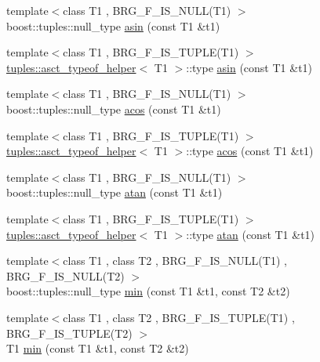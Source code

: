\begin{DoxyCompactItemize}
\item 
{\footnotesize template$<$class T1 , B\+R\+G\+\_\+\+F\+\_\+\+I\+S\+\_\+\+N\+U\+L\+L(\+T1) $>$ }\\boost\+::tuples\+::null\+\_\+type \hyperlink{namespaceIceBRG_a3748adeccfe6224ed0f6d39abcc87196}{asin} (const T1 \&t1)
\item 
{\footnotesize template$<$class T1 , B\+R\+G\+\_\+\+F\+\_\+\+I\+S\+\_\+\+T\+U\+P\+L\+E(\+T1) $>$ }\\\hyperlink{namespaceIceBRG_1_1tuples_structIceBRG_1_1tuples_1_1asct__typeof__helper}{tuples\+::asct\+\_\+typeof\+\_\+helper}$<$ T1 $>$\+::type \hyperlink{namespaceIceBRG_ae628f0785b41278377ed3143774c9346}{asin} (const T1 \&t1)
\item 
{\footnotesize template$<$class T1 , B\+R\+G\+\_\+\+F\+\_\+\+I\+S\+\_\+\+N\+U\+L\+L(\+T1) $>$ }\\boost\+::tuples\+::null\+\_\+type \hyperlink{namespaceIceBRG_a46a20b06ce2c8a11d5fa09bae0f3d6d3}{acos} (const T1 \&t1)
\item 
{\footnotesize template$<$class T1 , B\+R\+G\+\_\+\+F\+\_\+\+I\+S\+\_\+\+T\+U\+P\+L\+E(\+T1) $>$ }\\\hyperlink{namespaceIceBRG_1_1tuples_structIceBRG_1_1tuples_1_1asct__typeof__helper}{tuples\+::asct\+\_\+typeof\+\_\+helper}$<$ T1 $>$\+::type \hyperlink{namespaceIceBRG_a746db7e9f5b6a5dcc357bfb11c6f5458}{acos} (const T1 \&t1)
\item 
{\footnotesize template$<$class T1 , B\+R\+G\+\_\+\+F\+\_\+\+I\+S\+\_\+\+N\+U\+L\+L(\+T1) $>$ }\\boost\+::tuples\+::null\+\_\+type \hyperlink{namespaceIceBRG_a24b307329ff3c6b61fdaee3ba16079b5}{atan} (const T1 \&t1)
\item 
{\footnotesize template$<$class T1 , B\+R\+G\+\_\+\+F\+\_\+\+I\+S\+\_\+\+T\+U\+P\+L\+E(\+T1) $>$ }\\\hyperlink{namespaceIceBRG_1_1tuples_structIceBRG_1_1tuples_1_1asct__typeof__helper}{tuples\+::asct\+\_\+typeof\+\_\+helper}$<$ T1 $>$\+::type \hyperlink{namespaceIceBRG_a9c3bd35a13475944dc1624b05def6605}{atan} (const T1 \&t1)
\item 
{\footnotesize template$<$class T1 , class T2 , B\+R\+G\+\_\+\+F\+\_\+\+I\+S\+\_\+\+N\+U\+L\+L(\+T1) , B\+R\+G\+\_\+\+F\+\_\+\+I\+S\+\_\+\+N\+U\+L\+L(\+T2) $>$ }\\boost\+::tuples\+::null\+\_\+type \hyperlink{namespaceIceBRG_aa6b6fb2d7875bb865ebaf20c5c9cbc85}{min} (const T1 \&t1, const T2 \&t2)
\item 
{\footnotesize template$<$class T1 , class T2 , B\+R\+G\+\_\+\+F\+\_\+\+I\+S\+\_\+\+T\+U\+P\+L\+E(\+T1) , B\+R\+G\+\_\+\+F\+\_\+\+I\+S\+\_\+\+T\+U\+P\+L\+E(\+T2) $>$ }\\T1 \hyperlink{namespaceIceBRG_a12b9b6f4525e902edd948303a8f45987}{min} (const T1 \&t1, const T2 \&t2)

\end{DoxyCompactItemize}
